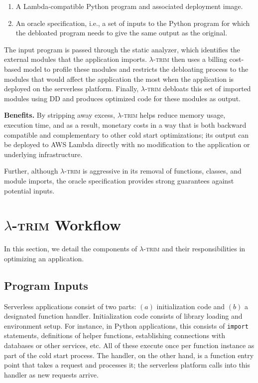 \documentclass[sigplan,nonacm]{acmart}
\newenvironment{vinenum}
{\begin{enumerate}[leftmargin=2.5em]
  \setlength{\itemsep}{0pt}
  \setlength{\labelwidth}{1em}
\setlength{\parsep}{0pt}
\setlength{\topsep}{0pt}
  \setlength{\partopsep}{0px}
  }
{\end{enumerate}}
\newcommand{\sys}{\textsc{\ensuremath{\lambda}-trim}\xspace}
\newcommand{\heading}[1]{\vspace{4pt}\noindent\textbf{#1.}}
\begin{document}
\begin{vinenum}
    \item A Lambda-compatible Python program and associated deployment image.
    \item An oracle specification, i.e., a set of inputs to the Python program for which the debloated program needs to give the same output as the original.
\end{vinenum}

The input program is passed through the static analyzer, which identifies the external modules that the application imports.
\sys then uses a billing cost-based model to profile these modules and restricts the debloating process to the modules that would affect the application the most when the application is deployed on the serverless platform.
Finally, \sys debloats this set of imported modules using DD and produces optimized code for these modules as output.


\heading{Benefits}
By stripping away excess, \sys helps reduce memory usage, execution time, and as a result, monetary costs in a way that is both backward compatible and complementary to other cold start optimizations;
its output can be deployed to AWS Lambda directly with no modification to the application or underlying infrastructure.


Further, although \sys is aggressive in its removal of functions, classes, and module imports, the oracle specification provides strong guarantees against potential inputs.

















\section{\texorpdfstring{\boldmath}{}\sys Workflow}

In this section, we detail the components of \sys and their responsibilities in optimizing an application.

\subsection{Program Inputs}



Serverless applications consist of two parts: $(a)$ initialization code and $(b)$ a designated function handler.
Initialization code consists of library loading and environment setup.
For instance, in Python applications, this consists of \texttt{import} statements, definitions of helper functions, establishing connections with databases or other services, etc.
All of these execute once per function instance as part of the cold start process.
The handler, on the other hand, is a function entry point that takes a request and processes it;
the serverless platform calls into this handler as new requests arrive.
\end{document}
